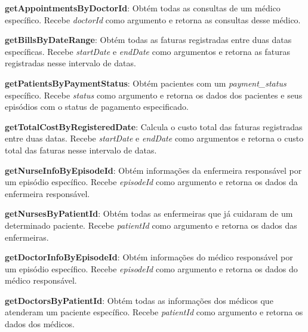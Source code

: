 \vspace{0.15cm}

\textbf{getAppointmentsByDoctorId}: Obtém todas as consultas de um médico específico. Recebe \textit{doctorId} como argumento e retorna as consultas desse médico.

\vspace{0.15cm}

\textbf{getBillsByDateRange}: Obtém todas as faturas registradas entre duas datas específicas. Recebe \textit{startDate} e \textit{endDate} como argumentos e retorna as faturas registradas nesse intervalo de datas.

\vspace{0.15cm}

\textbf{getPatientsByPaymentStatus}: Obtém pacientes com um \textit{payment\_status} específico. Recebe \textit{status} como argumento e retorna os dados dos pacientes e seus episódios com o status de pagamento especificado.

\vspace{0.15cm}

\textbf{getTotalCostByRegisteredDate}: Calcula o custo total das faturas registradas entre duas datas. Recebe \textit{startDate} e \textit{endDate} como argumentos e retorna o custo total das faturas nesse intervalo de datas.

\vspace{0.15cm}

\textbf{getNurseInfoByEpisodeId}: Obtém informações da enfermeira responsável por um episódio específico. Recebe \textit{episodeId} como argumento e retorna os dados da enfermeira responsável.

\vspace{0.15cm}

\textbf{getNursesByPatientId}: Obtém todas as enfermeiras que já cuidaram de um determinado paciente. Recebe \textit{patientId} como argumento e retorna os dados das enfermeiras.

\vspace{0.15cm}

\textbf{getDoctorInfoByEpisodeId}: Obtém informações do médico responsável por um episódio específico. Recebe \textit{episodeId} como argumento e retorna os dados do médico responsável.

\vspace{0.15cm}

\textbf{getDoctorsByPatientId}: Obtém todas as informações dos médicos que atenderam um paciente específico. Recebe \textit{patientId} como argumento e retorna os dados dos médicos.

